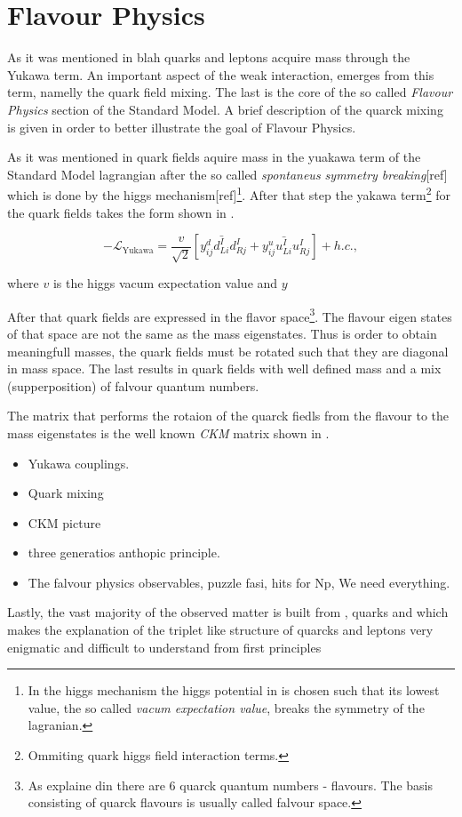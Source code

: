\section{Flavour Physics}
\label{Flavour_Physics}
As it was mentioned in blah quarks and leptons acquire mass through the Yukawa term.
An important aspect of the weak interaction, emerges from this term, namelly the quark field mixing.
The last is the core of the so called {\it Flavour Physics} section of the Standard Model.
A brief description of the quarck mixing is given in order to better illustrate the goal of Flavour Physics.

As it was mentioned in  quark fields aquire mass in the yuakawa
term of the Standard Model lagrangian after the so called {\it spontaneus symmetry breaking}[ref] which is done by the
higgs mechanism[ref]\footnote{In the higgs mechanism the higgs potential in 
is chosen such that its lowest value, the so called {\it vacum expectation value}, breaks the symmetry of the lagranian.}.
After that step the yakawa
term\footnote{Ommiting quark higgs field interaction terms.}
for the quark fields takes the form shown in .

\begin{equation}
  -\mathscr{L}_{\text{Yukawa}} = \frac{v}{\sqrt{2}} \left[ y_{ij}^d \bar{d^I_{Li}} d^I_{Rj} + y_{ij}^u \bar{u^I_{Li}} u^I_{Rj} \right] + h.c.,
  \label{yukawa_flavour}
\end{equation}

\noindent where $v$ is the higgs vacum expectation value and $y$

After that quark fields are expressed in the flavor
space\footnote{As explaine din  there are 6 quarck quantum numbers - flavours. The basis
consisting of quarck flavours is usually called falvour space.}.
The flavour eigen states of that space are not the same as the mass eigenstates. Thus is order to obtain
meaningfull masses, the quark fields must be rotated such that they are diagonal in mass space.
The last results in quark fields with well defined mass and a mix (supperposition) of falvour quantum numbers.

The matrix that performs the rotaion of the quarck fiedls from the flavour to the mass eigenstates is the
well known {\it CKM} matrix shown in \equref{}.

\begin{itemize}
  \item Yukawa couplings.
  \item Quark mixing
  \item CKM picture
  \item three generatios anthopic principle.
  \item The falvour physics observables, puzzle fasi, hits for Np, We need everything.
\end{itemize}
Lastly, the vast majority of the observed matter is built from \uquark, \dquark
    quarks and \electron which makes the explanation of the triplet like structure of quarcks and leptons very enigmatic and difficult
    to understand from first principles

